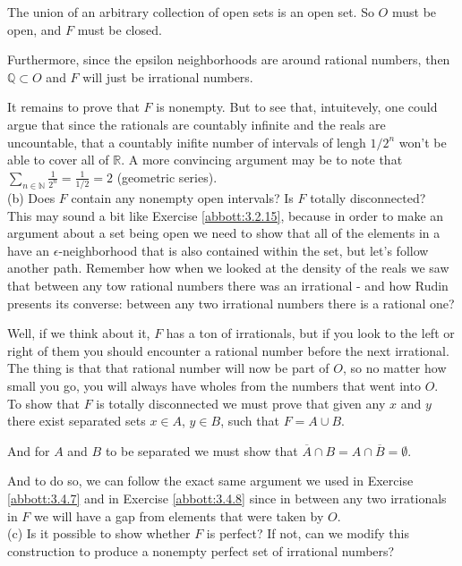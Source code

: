 The union of an arbitrary collection of open sets is an open set.
So $O$ must be open, and $F$ must be closed.

Furthermore, since the epsilon neighborhoods are around rational numbers,
then $\mathbb{Q} \subset O$ and $F$ will just be irrational numbers.

It remains to prove that $F$ is nonempty. But to see that, intuitevely, one could argue that
since the rationals are countably infinite and the reals are uncountable, that a countably inifite
number of intervals of lengh $1/2^n$ won't be able to cover all of $\mathbb{R}$.
A more convincing argument may be to note that
$\sum_{n\in\mathbb{N}} \frac{1}{2^n} = \frac{1}{1/2} = 2$ (geometric series).
\\

(b) Does $F$ contain any nonempty open intervals?
Is $F$ totally disconnected?
\\

This may sound a bit like Exercise \ref{abbott:3.2.15}, because in order to make an argument about
a set being open we need to show that all of the elements in a have an $\epsilon$-neighborhood
that is also contained within the set, but let's follow another path.
Remember how when we looked at the density of the reals we saw that between any tow rational numbers
there was an irrational - and how Rudin presents its converse: between any two irrational numbers there
is a rational one?

Well, if we think about it, $F$ has a ton of irrationals, but if you look to the left or right of them
you should encounter a rational number before the next irrational.
The thing is that that rational number will now be part of $O$, so no matter how small you go,
you will always have wholes from the numbers that went into $O$.
\\

To show that $F$ is totally disconnected we must prove that given any $x$ and $y$
there exist separated sets $x \in A$, $y \in B$, such that $F = A \cup B$.

And for $A$ and $B$ to be separated we must show that
$\overline{A} \cap B = A \cap \overline{B} = \emptyset$.

And to do so, we can follow the exact same argument we used in Exercise \ref{abbott:3.4.7}
and in Exercise \ref{abbott:3.4.8} since in between any two irrationals in $F$ we will have a gap
from elements that were taken by $O$.
\\

(c) Is it possible to show whether $F$ is perfect?
If not, can we modify this construction to produce a nonempty perfect set of irrational numbers?
\\

